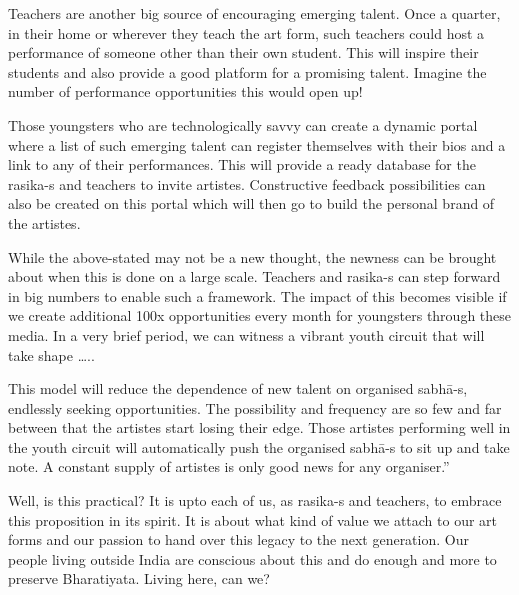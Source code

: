 \begin{itemize}
\begin{myquote}
Teachers are another big source of encouraging emerging talent. Once a quarter, in their home or wherever they teach the art form, such teachers could host a performance of someone other than their own student. This will inspire their students and also provide a good platform for a promising talent. Imagine the number of performance opportunities this would open up!
\end{myquote}

\begin{myquote}
Those youngsters who are technologically savvy can create a dynamic portal where a list of such emerging talent can register themselves with their bios and a link to any of their performances. This will provide a ready database for the rasika-s and teachers to invite artistes. Constructive feedback possibilities can also be created on this portal which will then go to build the personal brand of the artistes.
\end{myquote}

\begin{myquote}
While the above-stated may not be a new thought, the newness can be brought about when this is done on a large scale. Teachers and rasika-s can step forward in big numbers to enable such a framework. The impact of this becomes visible if we create additional 100x opportunities every month for youngsters through these media. In a very brief period, we can witness a vibrant youth circuit that will take shape …..
\end{myquote}

\begin{myquote}
This model will reduce the dependence of new talent on organised sabhā-s, endlessly seeking opportunities. The possibility and frequency are so few and far between that the artistes start losing their edge. Those artistes performing well in the youth circuit will automatically push the organised sabhā-s to sit up and take note. A constant supply of artistes is only good news for any organiser.”
\end{myquote}

 Well, is this practical? It is upto each of us, as rasika-s and teachers, to embrace this proposition in its spirit. It is about what kind of value we attach to our art forms and our passion to hand over this legacy to the next generation. Our people living outside India are conscious about this and do enough and more to preserve Bharatiyata. Living here, can we?


\end{itemize}
